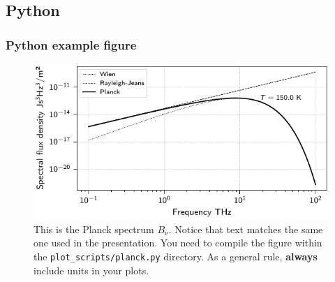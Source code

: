 \documentclass[
    10pt,
    aspectratio=169,
    xcolor={dvipsnames},
    spanish,
    ]{beamer}
\begin{document}
\subsection{Python}
\begin{frame}
  \frametitle{Python example figure}
  \begin{figure}
    \centering
    \includegraphics{planck.pdf}
    \caption{This is the Planck spectrum $B_\nu$. Notice that text matches the same one used in the presentation. You need to compile the figure within the \texttt{plot\_scripts/planck.py} directory. As a general rule, \textbf{always} include units in your plots.}
  \end{figure}
\end{frame}
\end{document}
